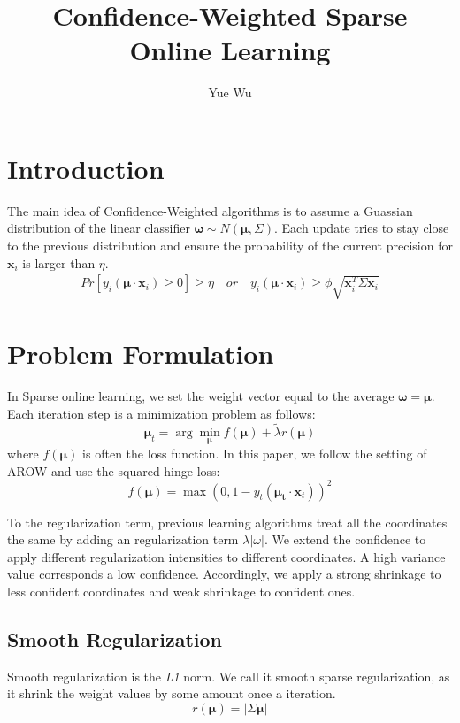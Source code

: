 \documentclass{article}
\begin{document}
\title{Confidence-Weighted Sparse Online Learning}
\author{Yue Wu}
\maketitle

\section{Introduction}
The main idea of Confidence-Weighted algorithms is to assume a Guassian distribution 
of the linear classifier $\bm{\omega}\sim N(\bm{\mu},\Sigma)$. Each update
tries to stay close to the previous distribution and ensure the
probability of the current precision for $\bm{x}_i$ is larger than
$\eta$.
\begin{equation}
  \begin{aligned}
    Pr[y_i(\bm{\mu}\cdot \bm{x}_i) \geq 0]  \geq \eta \quad or \quad
    y_i(\bm{\mu}\cdot \bm{x}_i)  \geq  \phi\sqrt{\bm{x}_i^T\Sigma\bm{x}_i}
  \end{aligned}
  \label{equ:01}
\end{equation}

\section{Problem Formulation}
In Sparse online learning, we set the weight vector equal to the average
$\bm{\omega} = \bm{\mu}$. Each iteration step is a minimization problem as follows:
\begin{equation}
    \bm{\mu}_{t} = \arg\min_{\bm{\mu}}{f(\bm{\mu}) + \tilde{\lambda} r(\bm{\mu})}
    \label{equ:02}
\end{equation}
where $f(\bm{\mu})$ is often the loss function. In this paper, we follow the
setting of AROW and use the squared hinge loss:
\begin{equation}
    f(\bm{\mu}) = \max(0, 1 - y_t (\bm{\mu_t}\cdot \bm{x}_t))^2
    \label{equ:03}
\end{equation}

To the regularization term, previous learning algorithms treat all the
coordinates the same by adding an regularization term
$\lambda|\omega|$. We extend the confidence to apply different
regularization intensities to different coordinates. A high variance value
corresponds a low confidence.  Accordingly, we apply a strong shrinkage to
less confident coordinates and weak shrinkage to confident ones.

\subsection{Smooth Regularization}
Smooth regularization is the \textit{L1} norm. We call it smooth 
sparse regularization, as it shrink the weight values by some amount once a
iteration.
\begin{equation}
    r(\bm{\mu})  = |\Sigma\bm{\mu}|
    \label{equ:04}
\end{equation}
\end{document}
